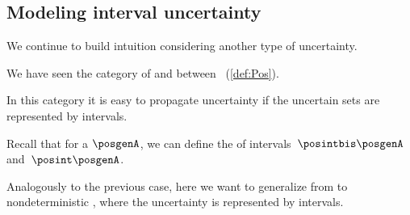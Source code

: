 \subsection{Modeling interval uncertainty}

We continue to build intuition considering another type of uncertainty.

We have seen the category \Pos of  and   between ~(\cref{def:Pos}).

In this category it is easy to propagate uncertainty if the uncertain sets are represented by intervals.

Recall that for a  $\posgenA$, we can define the  of intervals~$\posintbis\posgenA$ and~$\posint\posgenA$.

Analogously to the previous case, here we want to generalize from  to nondeterministic , where the uncertainty is represented by intervals.

